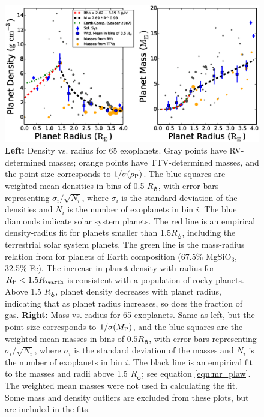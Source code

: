 \documentclass[iop]{emulateapj}
\newcommand{\rpl}{\ensuremath{R_{\rm P}}}
\newcommand{\mpl}{\ensuremath{M_{\rm P}}}
\newcommand{\rhopl}{\ensuremath{\rho_{\rm P}}}
\newcommand{\rearth}{\ensuremath{R_\earth}}
\begin{document}
\begin{figure}[htbp] %
   \centering
    \includegraphics[width=7in]{mr_small.eps} 
   \caption{\small \textbf{Left:} Density vs. radius for 65 exoplanets.  Gray points  have RV-determined masses; orange points have TTV-determined masses, and the point size corresponds to $1/\sigma(\rhopl)$.  The blue squares are weighted mean densities in bins of 0.5 \rearth, with error bars representing $\sigma_i/\sqrt{N_i}$, where $\sigma_i$ is the standard deviation of the densities and $N_i$ is the number of exoplanets in bin $i$.  The blue diamonds indicate solar system planets.  The red line is an empirical density-radius fit for planets smaller than 1.5\rearth, including the terrestrial solar system planets.  The green line is the mass-radius relation from \citet{Seager2007} for planets of Earth composition (67.5\% MgSiO$_3$, 32.5\% Fe).  The increase in planet density with radius for $\rpl < 1.5 \rearth$ is consistent with a population of rocky planets.  Above 1.5 \rearth, planet density decreases with planet radius, indicating that as planet radius increases, so does the fraction of gas.  \textbf{Right:} Mass vs. radius for 65 exoplanets.  Same as left, but the point size corresponds to $1/\sigma(\mpl)$, and the blue squares are the weighted mean masses in bins of $0.5 \rearth$, with error bars representing $\sigma_i/\sqrt{N_i}$, where $\sigma_i$ is the standard deviation of the masses and $N_i$ is the number of exoplanets in bin $i$. The black line is an empirical fit to the masses and radii above 1.5 \rearth; see equation \ref{eqn:mr_plaw}.  The weighted mean masses were not used in calculating the fit.   Some mass and density outliers are excluded from these plots, but are included in the fits. }
   \label{fig:rm_4}
\end{figure}
\end{document}
